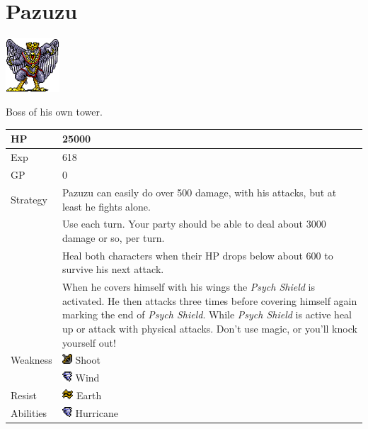 \section{Pazuzu}
\label{monster:pazuzu}

\includegraphics[height=2cm,keepaspectratio]{./resources/monster/pazuzu}

Boss of his own tower.

\begin{longtable}{ l p{9cm} }
	HP
	& 25000
\\ \hline
	Exp
	& 618
\\ \hline
	GP
	& 0
\\ \hline
	Strategy
	& Pazuzu can easily do over 500 damage, with his attacks, but at least he fights alone. \\
	& Use \nameref{spell:aero} each turn. Your party should be able to deal about 3000 damage or so, per turn. \\
	& Heal both characters when their HP drops below about 600 to survive his next attack. \\
	& When he covers himself with his wings the \textit{Psych Shield} is activated. He then attacks three times before covering himself again marking the end of \textit{Psych Shield}. While \textit{Psych Shield} is active heal up or attack with physical attacks. Don’t use magic, or you’ll knock yourself out!
\\ \hline
	Weakness
	& \includegraphics[height=1em,keepaspectratio]{./resources/effects/shoot} Shoot \\
	& \includegraphics[height=1em,keepaspectratio]{./resources/effects/wind} Wind
\\ \hline
	Resist
	& \includegraphics[height=1em,keepaspectratio]{./resources/effects/earth} Earth
\\ \hline
	Abilities
	& \includegraphics[height=1em,keepaspectratio]{./resources/effects/wind} Hurricane \\

\end{longtable}
